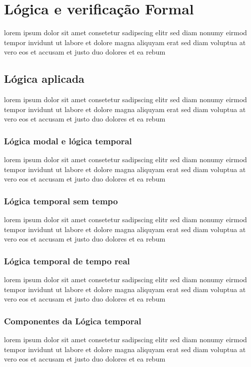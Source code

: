 \section{Lógica e verificação Formal}
lorem ipsum dolor sit amet consetetur sadipscing elitr sed diam nonumy
eirmod tempor invidunt ut labore et dolore magna aliquyam erat sed diam
voluptua at vero eos et accusam et justo duo dolores et ea rebum

\subsection{Lógica aplicada}
lorem ipsum dolor sit amet consetetur sadipscing elitr sed diam nonumy
eirmod tempor invidunt ut labore et dolore magna aliquyam erat sed diam
voluptua at vero eos et accusam et justo duo dolores et ea rebum

\subsubsection{Lógica modal e lógica temporal}
lorem ipsum dolor sit amet consetetur sadipscing elitr sed diam nonumy
eirmod tempor invidunt ut labore et dolore magna aliquyam erat sed diam
voluptua at vero eos et accusam et justo duo dolores et ea rebum

\subsubsection{Lógica temporal sem tempo}
lorem ipsum dolor sit amet consetetur sadipscing elitr sed diam nonumy
eirmod tempor invidunt ut labore et dolore magna aliquyam erat sed diam
voluptua at vero eos et accusam et justo duo dolores et ea rebum

\subsubsection{Lógica temporal de tempo real}
lorem ipsum dolor sit amet consetetur sadipscing elitr sed diam nonumy
eirmod tempor invidunt ut labore et dolore magna aliquyam erat sed diam
voluptua at vero eos et accusam et justo duo dolores et ea rebum

\subsubsection{Componentes da Lógica temporal}
lorem ipsum dolor sit amet consetetur sadipscing elitr sed diam nonumy
eirmod tempor invidunt ut labore et dolore magna aliquyam erat sed diam
voluptua at vero eos et accusam et justo duo dolores et ea rebum

